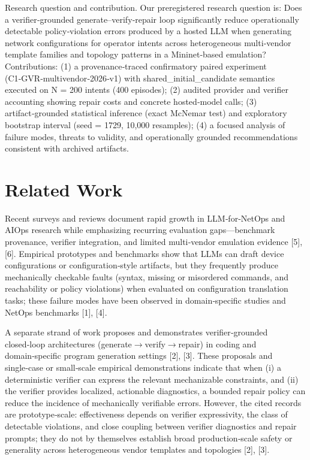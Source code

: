 \documentclass[conference]{IEEEtran}
\begin{document}
Research question and contribution. Our preregistered research question is: Does a verifier‑grounded generate--verify‑repair loop significantly reduce operationally detectable policy‑violation errors produced by a hosted LLM when generating network configurations for operator intents across heterogeneous multi‑vendor template families and topology patterns in a Mininet‑based emulation? Contributions: (1) a provenance‑traced confirmatory paired experiment (C1‑GVR‑multivendor‑2026‑v1) with shared\_initial\_candidate semantics executed on N = 200 intents (400 episodes); (2) audited provider and verifier accounting showing repair costs and concrete hosted‑model calls; (3) artifact‑grounded statistical inference (exact McNemar test) and exploratory bootstrap interval (seed = 1729, 10,000 resamples); (4) a focused analysis of failure modes, threats to validity, and operationally grounded recommendations consistent with archived artifacts.

\section{Related Work}
Recent surveys and reviews document rapid growth in LLM‑for‑NetOps and AIOps research while emphasizing recurring evaluation gaps---benchmark provenance, verifier integration, and limited multi‑vendor emulation evidence [5], [6]. Empirical prototypes and benchmarks show that LLMs can draft device configurations or configuration‑style artifacts, but they frequently produce mechanically checkable faults (syntax, missing or misordered commands, and reachability or policy violations) when evaluated on configuration translation tasks; these failure modes have been observed in domain‑specific studies and NetOps benchmarks [1], [4].

A separate strand of work proposes and demonstrates verifier‑grounded closed‑loop architectures (generate\ensuremath{\rightarrow}verify\ensuremath{\rightarrow}repair) in coding and domain‑specific program generation settings [2], [3]. These proposals and single‑case or small‑scale empirical demonstrations indicate that when (i) a deterministic verifier can express the relevant mechanizable constraints, and (ii) the verifier provides localized, actionable diagnostics, a bounded repair policy can reduce the incidence of mechanically verifiable errors. However, the cited records are prototype‑scale: effectiveness depends on verifier expressivity, the class of detectable violations, and close coupling between verifier diagnostics and repair prompts; they do not by themselves establish broad production‑scale safety or generality across heterogeneous vendor templates and topologies [2], [3].
\end{document}
